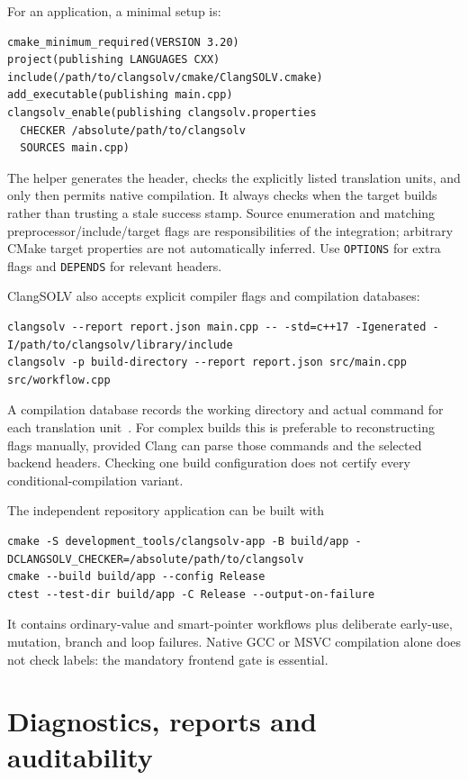 \documentclass[11pt]{article}
\begin{document}
For an application, a minimal setup is:
\begin{lstlisting}
cmake_minimum_required(VERSION 3.20)
project(publishing LANGUAGES CXX)
include(/path/to/clangsolv/cmake/ClangSOLV.cmake)
add_executable(publishing main.cpp)
clangsolv_enable(publishing clangsolv.properties
  CHECKER /absolute/path/to/clangsolv
  SOURCES main.cpp)
\end{lstlisting}
The helper generates the header, checks the explicitly listed translation
units, and only then permits native compilation. It always checks when the
target builds rather than trusting a stale success stamp. Source enumeration
and matching preprocessor/include/target flags are responsibilities of the
integration; arbitrary CMake target properties are not automatically inferred.
Use \texttt{OPTIONS} for extra flags and \texttt{DEPENDS} for relevant headers.

ClangSOLV also accepts explicit compiler flags and compilation databases:
\begin{lstlisting}
clangsolv --report report.json main.cpp -- -std=c++17 -Igenerated -I/path/to/clangsolv/library/include
clangsolv -p build-directory --report report.json src/main.cpp src/workflow.cpp
\end{lstlisting}
A compilation database records the working directory and actual command
for each translation unit~\cite{compdb}. For complex builds this is preferable
to reconstructing flags manually, provided Clang can parse those commands
and the selected backend headers. Checking one build configuration does not
certify every conditional-compilation variant.

The independent repository application can be built with
\begin{lstlisting}
cmake -S development_tools/clangsolv-app -B build/app -DCLANGSOLV_CHECKER=/absolute/path/to/clangsolv
cmake --build build/app --config Release
ctest --test-dir build/app -C Release --output-on-failure
\end{lstlisting}
It contains ordinary-value and smart-pointer workflows plus deliberate
early-use, mutation, branch and loop failures. Native GCC or MSVC compilation
alone does not check labels: the mandatory frontend gate is essential.

\section{Diagnostics, reports and auditability}
\end{document}
